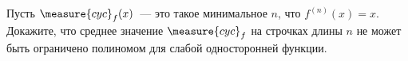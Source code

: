 Пусть $\measure{cyc}_{f}(x)$~--- это такое минимальное $n$, что $f^{(n)}(x) = x$. Докажите, что среднее
значение $\measure{cyc}_{f}$ на строчках длины $n$ не может быть ограничено полиномом для слабой
односторонней функции.
